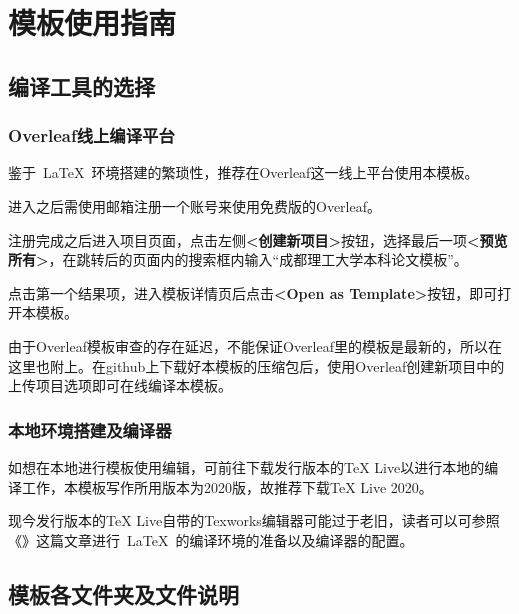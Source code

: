 \chapter{模板使用指南}

\section{编译工具的选择}

\subsection{Overleaf线上编译平台}

鉴于~\LaTeX~环境搭建的繁琐性，推荐在Overleaf这一线上平台使用本模板。

进入之后需使用邮箱注册一个账号来使用免费版的Overleaf。

注册完成之后进入项目页面，点击左侧\textbf{<创建新项目>}按钮，选择最后一项\textbf{<预览所有>}，在跳转后的页面内的搜索框内输入“成都理工大学本科论文模板”。

点击第一个结果项，进入模板详情页后点击\textbf{<Open as Template>}按钮，即可打开本模板。

由于Overleaf模板审查的存在延迟，不能保证Overleaf里的模板是最新的，所以在这里也附上。在github上下载好本模板的压缩包后，使用Overleaf创建新项目中的上传项目选项即可在线编译本模板。

\subsection{本地环境搭建及编译器}

如想在本地进行模板使用编辑，可前往下载发行版本的TeX Live以进行本地的编译工作，本模板写作所用版本为2020版，故推荐下载TeX Live 2020。

现今发行版本的TeX Live自带的Texworks编辑器可能过于老旧，读者可以可参照《》这篇文章进行~\LaTeX~的编译环境的准备以及编译器的配置。

\section{模板各文件夹及文件说明}

